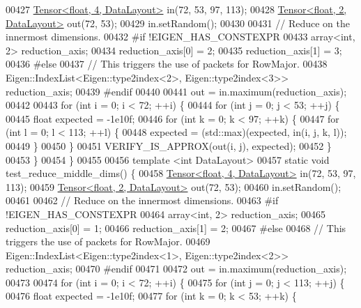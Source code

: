 \begin{DoxyCode}
00427   \hyperlink{class_eigen_1_1_tensor}{Tensor<float, 4, DataLayout>} in(72, 53, 97, 113);
00428   \hyperlink{class_eigen_1_1_tensor}{Tensor<float, 2, DataLayout>} out(72, 53);
00429   in.setRandom();
00430 
00431 \textcolor{comment}{// Reduce on the innermost dimensions.}
00432 \textcolor{preprocessor}{#if !EIGEN\_HAS\_CONSTEXPR}
00433   array<int, 2> reduction\_axis;
00434   reduction\_axis[0] = 2;
00435   reduction\_axis[1] = 3;
00436 \textcolor{preprocessor}{#else}
00437   \textcolor{comment}{// This triggers the use of packets for RowMajor.}
00438   Eigen::IndexList<Eigen::type2index<2>, Eigen::type2index<3>> reduction\_axis;
00439 \textcolor{preprocessor}{#endif}
00440 
00441   out = in.maximum(reduction\_axis);
00442 
00443   \textcolor{keywordflow}{for} (\textcolor{keywordtype}{int} i = 0; i < 72; ++i) \{
00444     \textcolor{keywordflow}{for} (\textcolor{keywordtype}{int} j = 0; j < 53; ++j) \{
00445       \textcolor{keywordtype}{float} expected = -1e10f;
00446       \textcolor{keywordflow}{for} (\textcolor{keywordtype}{int} k = 0; k < 97; ++k) \{
00447         \textcolor{keywordflow}{for} (\textcolor{keywordtype}{int} l = 0; l < 113; ++l) \{
00448           expected = (std::max)(expected, in(i, j, k, l));
00449         \}
00450       \}
00451       VERIFY\_IS\_APPROX(out(i, j), expected);
00452     \}
00453   \}
00454 \}
00455 
00456 \textcolor{keyword}{template} <\textcolor{keywordtype}{int} DataLayout>
00457 \textcolor{keyword}{static} \textcolor{keywordtype}{void} test\_reduce\_middle\_dims() \{
00458   \hyperlink{class_eigen_1_1_tensor}{Tensor<float, 4, DataLayout>} in(72, 53, 97, 113);
00459   \hyperlink{class_eigen_1_1_tensor}{Tensor<float, 2, DataLayout>} out(72, 53);
00460   in.setRandom();
00461 
00462 \textcolor{comment}{// Reduce on the innermost dimensions.}
00463 \textcolor{preprocessor}{#if !EIGEN\_HAS\_CONSTEXPR}
00464   array<int, 2> reduction\_axis;
00465   reduction\_axis[0] = 1;
00466   reduction\_axis[1] = 2;
00467 \textcolor{preprocessor}{#else}
00468   \textcolor{comment}{// This triggers the use of packets for RowMajor.}
00469   Eigen::IndexList<Eigen::type2index<1>, Eigen::type2index<2>> reduction\_axis;
00470 \textcolor{preprocessor}{#endif}
00471 
00472   out = in.maximum(reduction\_axis);
00473 
00474   \textcolor{keywordflow}{for} (\textcolor{keywordtype}{int} i = 0; i < 72; ++i) \{
00475     \textcolor{keywordflow}{for} (\textcolor{keywordtype}{int} j = 0; j < 113; ++j) \{
00476       \textcolor{keywordtype}{float} expected = -1e10f;
00477       \textcolor{keywordflow}{for} (\textcolor{keywordtype}{int} k = 0; k < 53; ++k) \{

\end{DoxyCode}
